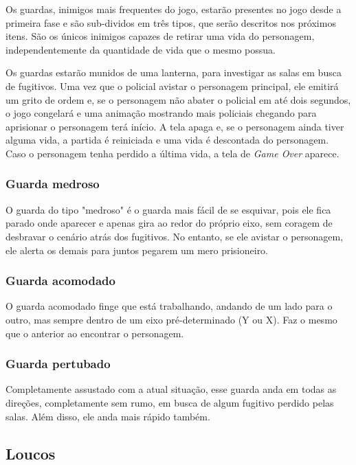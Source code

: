\documentclass[12pt]{article}
\begin{document}
Os guardas, inimigos mais frequentes do jogo, estarão presentes no jogo desde a primeira fase e são sub-dividos em três tipos, que serão descritos nos próximos itens. São os únicos inimigos capazes de retirar uma vida do personagem, independentemente da quantidade de vida que o mesmo possua.

Os guardas estarão munidos de uma lanterna, para investigar as salas em busca de fugitivos. Uma vez que o policial avistar o personagem principal, ele emitirá um grito de ordem e, se o personagem não abater o policial em até dois segundos, o jogo congelará e uma animação mostrando mais policiais chegando para aprisionar o personagem terá início. A tela apaga e, se o personagem ainda tiver alguma vida, a partida é reiniciada e uma vida é descontada do personagem. Caso o personagem tenha perdido a última vida, a tela de \textit{Game Over} aparece.

\subsubsection*{Guarda medroso}

O guarda do tipo "medroso" é o guarda mais fácil de se esquivar, pois ele fica parado onde aparecer e apenas gira ao redor do próprio eixo, sem coragem de desbravar o cenário atrás dos fugitivos. No entanto, se ele avistar o personagem, ele alerta os demais para juntos pegarem um mero prisioneiro.

\subsubsection*{Guarda acomodado}

O guarda acomodado finge que está trabalhando, andando de um lado para o outro, mas sempre dentro de um eixo pré-determinado (Y ou X). Faz o mesmo que o anterior ao encontrar o personagem.

\subsubsection*{Guarda pertubado}

Completamente assustado com a atual situação, esse guarda anda em todas as direções, completamente sem rumo, em busca de algum fugitivo perdido pelas salas. Além disso, ele anda mais rápido também.

\subsection{Loucos}
\end{document}

